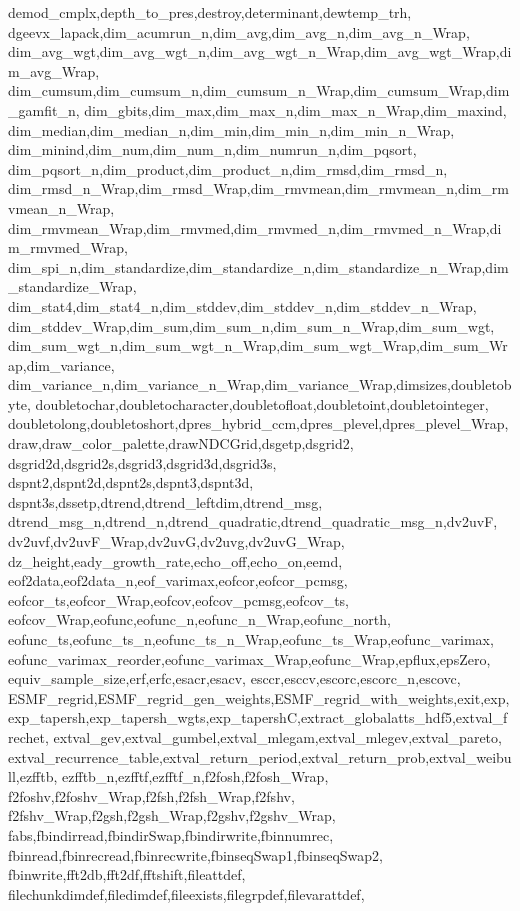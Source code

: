 {{	demod_cmplx,depth_to_pres,destroy,determinant,dewtemp_trh,
	dgeevx_lapack,dim_acumrun_n,dim_avg,dim_avg_n,dim_avg_n_Wrap,
	dim_avg_wgt,dim_avg_wgt_n,dim_avg_wgt_n_Wrap,dim_avg_wgt_Wrap,dim_avg_Wrap,
	dim_cumsum,dim_cumsum_n,dim_cumsum_n_Wrap,dim_cumsum_Wrap,dim_gamfit_n,
	dim_gbits,dim_max,dim_max_n,dim_max_n_Wrap,dim_maxind,
	dim_median,dim_median_n,dim_min,dim_min_n,dim_min_n_Wrap,
	dim_minind,dim_num,dim_num_n,dim_numrun_n,dim_pqsort,
	dim_pqsort_n,dim_product,dim_product_n,dim_rmsd,dim_rmsd_n,
	dim_rmsd_n_Wrap,dim_rmsd_Wrap,dim_rmvmean,dim_rmvmean_n,dim_rmvmean_n_Wrap,
	dim_rmvmean_Wrap,dim_rmvmed,dim_rmvmed_n,dim_rmvmed_n_Wrap,dim_rmvmed_Wrap,
	dim_spi_n,dim_standardize,dim_standardize_n,dim_standardize_n_Wrap,dim_standardize_Wrap,
	dim_stat4,dim_stat4_n,dim_stddev,dim_stddev_n,dim_stddev_n_Wrap,
	dim_stddev_Wrap,dim_sum,dim_sum_n,dim_sum_n_Wrap,dim_sum_wgt,
	dim_sum_wgt_n,dim_sum_wgt_n_Wrap,dim_sum_wgt_Wrap,dim_sum_Wrap,dim_variance,
	dim_variance_n,dim_variance_n_Wrap,dim_variance_Wrap,dimsizes,doubletobyte,
	doubletochar,doubletocharacter,doubletofloat,doubletoint,doubletointeger,
	doubletolong,doubletoshort,dpres_hybrid_ccm,dpres_plevel,dpres_plevel_Wrap,
	draw,draw_color_palette,drawNDCGrid,dsgetp,dsgrid2,
	dsgrid2d,dsgrid2s,dsgrid3,dsgrid3d,dsgrid3s,
	dspnt2,dspnt2d,dspnt2s,dspnt3,dspnt3d,
	dspnt3s,dssetp,dtrend,dtrend_leftdim,dtrend_msg,
	dtrend_msg_n,dtrend_n,dtrend_quadratic,dtrend_quadratic_msg_n,dv2uvF,
	dv2uvf,dv2uvF_Wrap,dv2uvG,dv2uvg,dv2uvG_Wrap,
	dz_height,eady_growth_rate,echo_off,echo_on,eemd,
	eof2data,eof2data_n,eof_varimax,eofcor,eofcor_pcmsg,
	eofcor_ts,eofcor_Wrap,eofcov,eofcov_pcmsg,eofcov_ts,
	eofcov_Wrap,eofunc,eofunc_n,eofunc_n_Wrap,eofunc_north,
	eofunc_ts,eofunc_ts_n,eofunc_ts_n_Wrap,eofunc_ts_Wrap,eofunc_varimax,
	eofunc_varimax_reorder,eofunc_varimax_Wrap,eofunc_Wrap,epflux,epsZero,
	equiv_sample_size,erf,erfc,esacr,esacv,
	esccr,esccv,escorc,escorc_n,escovc,
	ESMF_regrid,ESMF_regrid_gen_weights,ESMF_regrid_with_weights,exit,exp,
	exp_tapersh,exp_tapersh_wgts,exp_tapershC,extract_globalatts_hdf5,extval_frechet,
	extval_gev,extval_gumbel,extval_mlegam,extval_mlegev,extval_pareto,
	extval_recurrence_table,extval_return_period,extval_return_prob,extval_weibull,ezfftb,
	ezfftb_n,ezfftf,ezfftf_n,f2fosh,f2fosh_Wrap,
	f2foshv,f2foshv_Wrap,f2fsh,f2fsh_Wrap,f2fshv,
	f2fshv_Wrap,f2gsh,f2gsh_Wrap,f2gshv,f2gshv_Wrap,
	fabs,fbindirread,fbindirSwap,fbindirwrite,fbinnumrec,
	fbinread,fbinrecread,fbinrecwrite,fbinseqSwap1,fbinseqSwap2,
	fbinwrite,fft2db,fft2df,fftshift,fileattdef,
	filechunkdimdef,filedimdef,fileexists,filegrpdef,filevarattdef,
}}

